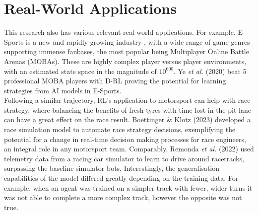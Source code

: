 \section{Real-World Applications}
This research also has various relevant real world applications. For example, E-Sports is a new and rapidly-growing industry \cite{block2021esports}, with a wide range of game genres supporting immense fanbases, the most popular being Multiplayer Online Battle Arenas (MOBAs). These are highly complex player versus player environments, with an estimated state space in the magnitude of $10^{600}$. Ye \textit{et al.} (2020) \cite{ye2020mastering} beat 5 professional MOBA players with D-RL proving the potential for learning strategies from AI models in E-Sports.\\ Following a similar trajectory, RL's application to motorsport can help with race strategy, where balancing the benefits of fresh tyres with time lost in the pit lane can have a great effect on the race result. Boettinger \& Klotz (2023) \cite{boettinger2023mastering} developed a race simulation model to automate race strategy decisions, exemplifying the potential for a change in real-time decision making processes for race engineers, an integral role in any motorsport team. Comparably, Remonda \textit{et al.} (2022) \cite{remonda2021formula} used telemetry data from a racing car simulator to learn to drive around racetracks, surpassing the baseline simulator bots. Interestingly, the generalisation capabilities of the model differed greatly depending on the training data. For example, when an agent was trained on a simpler track with fewer, wider turns it was not able to complete a more complex track, however the opposite was not true.
